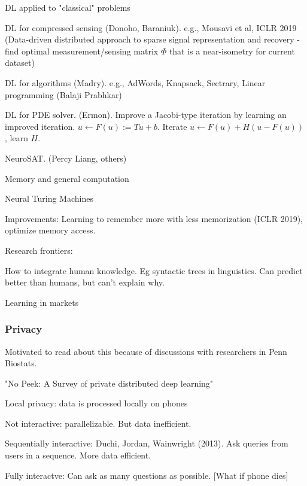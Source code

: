 \documentclass[english]{article}
\begin{document}
\item DL applied to "classical" problems

DL for compressed sensing (Donoho, Baraniuk). e.g., Mousavi et al, ICLR 2019 (Data-driven distributed approach to sparse signal representation and recovery - find optimal measurement/sensing matrix $\Phi$ that is a near-isometry for current dataset)

DL for algorithms (Madry). e.g., AdWords, Knapsack, Sectrary, Linear programming (Balaji Prabhkar)

DL for PDE solver. (Ermon). Improve a Jacobi-type iteration by learning an improved iteration. $u\gets  F(u):=Tu+b$. Iterate $u\gets  F(u) + H(u-F(u))$, learn $H$.

NeuroSAT. (Percy Liang, others)

\item Memory and general computation

Neural Turing Machines

Improvements: Learning to remember more with less memorization (ICLR 2019), optimize memory access.


\item Research frontiers: 

How to integrate human knowledge. Eg syntactic trees in linguistics. Can predict better than humans, but can't explain why. 

\item Learning in markets
\eenum 


\subsubsection{Privacy}


\benum 
\item Motivated to read about this because of discussions with researchers in Penn Biostats.

\item "No Peek: A Survey of private distributed deep
learning"

\item Local privacy: data is processed locally on phones

Not interactive:  parallelizable. But data inefficient.

Sequentially interactive: Duchi, Jordan, Wainwright (2013). Ask queries from users in a sequence. More data efficient.

Fully interactve: Can ask as many questions as possible. [What if phone dies]
\end{document}
